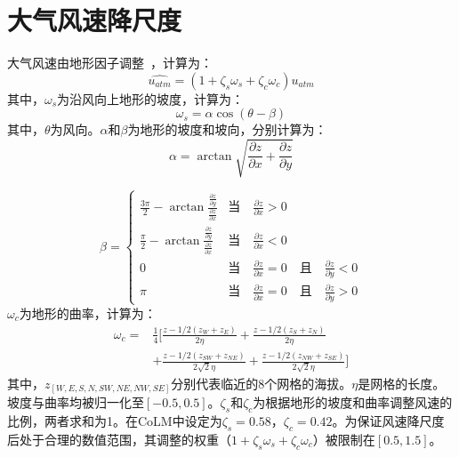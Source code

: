 \section{大气风速降尺度}\label{大气风速降尺度}
大气风速由地形因子调整~\citep{liston2006Meteorological}，计算为：
\begin{equation}
\hat{u_{a t m}}=\left(1+\zeta_{s}\omega_{s}+\zeta_{c}\omega_{c}\right)u_{atm}
\end{equation}
其中，$\omega_{s}$为沿风向上地形的坡度，计算为：
\begin{equation}
\omega_{s}=\alpha \cos{\left(\theta-\beta\right)}
\end{equation}
其中，$\theta$为风向。$\alpha$和$\beta$为地形的坡度和坡向，分别计算为：
\begin{equation}
\alpha=\arctan \sqrt{\frac{\partial z}{\partial x}+\frac{\partial z}{\partial y}}
\end{equation}

\begin{equation}
\beta=\begin{cases}
    \frac{3\pi}{2}-\arctan \frac{\frac{\partial z}{\partial y}}{\frac{\partial z}{\partial x}} & \text{当}\quad \frac{\partial z}{\partial x}>0 \\
    \frac{\pi}{2}-\arctan \frac{\frac{\partial z}{\partial y}}{\frac{\partial z}{\partial x}} & \text{当}\quad \frac{\partial z}{\partial x}<0 \\
    0 & \text{当}\quad \frac{\partial z}{\partial x}=0\quad \text{且}\quad \frac{\partial z}{\partial y}<0 \\
    \pi & \text{当}\quad \frac{\partial z}{\partial x}=0\quad \text{且}\quad \frac{\partial z}{\partial y}>0 
\end{cases}
\end{equation}
$\omega_{c}$为地形的曲率，计算为：
\begin{equation}
    \begin{split}
    \omega_{c}=&\frac{1}{4}[\frac{z-1/2\left(z_{W}+z_{E}\right)}{2\eta}+\frac{z-1/2\left(z_{S}+z_{N}\right)}{2\eta} \\
    & +\frac{z-1/2\left(z_{SW}+z_{NE}\right)}{2\sqrt{2}\eta}+\frac{z-1/2\left(z_{NW}+z_{SE}\right)}{2\sqrt{2}\eta}]
    \end{split}
\end{equation}
其中，$z_{[W,E,S,N,SW,NE,NW,SE]}$分别代表临近的8个网格的海拔。$\eta$是网格的长度。坡度与曲率均被归一化至$[-0.5,0.5]$。$\zeta_{s}$和$\zeta_{c}$为根据地形的坡度和曲率调整风速的比例，两者求和为1。在CoLM中设定为$\zeta_{s}=0.58$，$\zeta_{c}=0.42$。为保证风速降尺度后处于合理的数值范围，其调整的权重（$1+\zeta_{s}\omega_{s}+\zeta_{c}\omega_{c}$）被限制在$[0.5,1.5]$。

